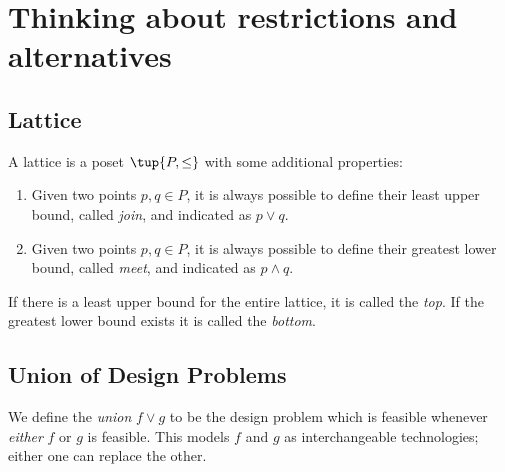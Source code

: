 \section{Thinking about restrictions and alternatives}
\subsection{Lattice}
\begin{definition}[Lattice]
\label{def:lattice}
A lattice is a poset $\tup{P, \leq}$ with some additional properties:
\begin{enumerate}
    \item Given two points $p, q \in P$, it is always possible to define their least upper bound, called \emph{join}, and indicated as $p \vee q$.
    \item Given two points $p, q \in P$, it is always possible to define their greatest lower bound, called \emph{meet}, and indicated as $p \wedge q$.
\end{enumerate}
\end{definition}

If there is a least upper bound for the entire lattice, it is called
the \emph{top}. If the greatest lower bound exists it is called the \emph{bottom}.

\begin{example}
\begin{center}
\end{center}
\end{example}
\subsection{Union of Design Problems}

We define the \emph{union} $f \vee g$ to be the design problem which is feasible whenever \emph{either} $f$ or $g$ is feasible. This models $f$ and $g$ as interchangeable technologies; either one can replace the other.

